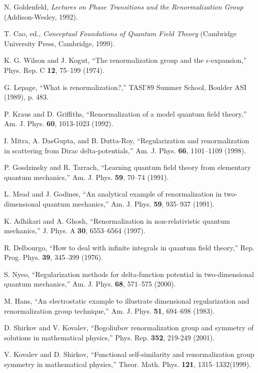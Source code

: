 \documentclass[floatfix,preprintnumbers,amsmath,amssymb,prb,12pt]{revtex4-1}
\begin{document}
{{\begin{thebibliography}{10}
 N. Goldenfeld,
\emph{Lectures on Phase Transitions and the Renormalization Group}
(Addison-Wesley, 1992).

T. Cao, ed.,
\emph{Conceptual Foundations of Quantum Field Theory} (Cambridge
University Press, Cambridge, 1999).

 K. G. Wilson and J. Kogut, ``The
renormalization group and the $\epsilon$-expansion,'' Phys. Rep. C
\textbf{12}, 75--199 (1974).

G. Lepage, ``What is renormalization?,'' TASI'89
Summer School, Boulder ASI (1989), p. 483.

P. Kraus and D. Griffiths, ``Renormalization of a
model quantum field theory,'' Am. J. Phys. \textbf{60}, 1013-1023
(1992).

 I. Mitra, A. DasGupta, and B. Dutta-Roy,
``Regularization and renormalization in scattering from Dirac
delta-potentials,'' Am. J. Phys. \textbf{66}, 1101--1109 (1998).

P. Gosdzinsky and R. Tarrach, ``Learning
quantum field theory from elementary quantum mechanics,'' Am. J.
Phys. \textbf{59}, 70--74 (1991).

L. Mead and J. Godines, ``An analytical example of
renormalization in two-dimensional quantum mechanics,'' Am. J.
Phys. \textbf{59}, 935--937 (1991).

 K. Adhikari and A. Ghosh, ``Renormalization
in non-relativistic quantum mechanics,'' J. Phys. A \textbf{30},
6553--6564 (1997).

 R. Delbourgo, ``How to deal with infinite
integrals in quantum field theory,'' Rep. Prog. Phys. \textbf{39},
345--399 (1976).

 S. Nyeo, ``Regularization methods for
delta-function potential in two-dimensional quantum mechanics,''
Am. J. Phys. \textbf{68}, 571--575 (2000).

 M. Hans, ``An electrostatic example to illustrate
dimensional regularization and renormalization group technique,''
Am. J. Phys. \textbf{51}, 694--698
(1983).

 D. Shirkov and V. Kovalev, ``Bogoliubov
renormalization group and symmetry of solutions in mathematical
physics,'' Phys. Rep.
\textbf{352}, 219-249 (2001).

 V. Kovalev and D. Shirkov, ``Functional
self-similarity and renormalization group symmetry in mathematical
physics,'' Theor. Math. Phys. \textbf{121}, 1315--1332(1999).


\end{thebibliography}}}
\end{document}
